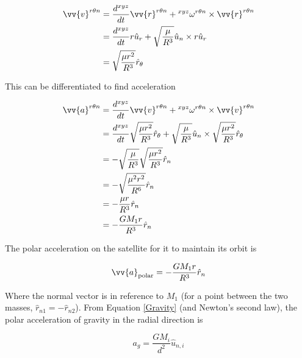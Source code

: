\documentclass[../basicOrbitalDynamics.tex]{subfiles}
\begin{document}
\begin{align*}
    \vv{v}^{r\theta{}n} & =\frac{d^{xyz}}{dt}{\vv{r}^{r\theta{}n}}+\prescript{xyz}{}{\omega}^{r\theta{}n}\times{}\vv{r}^{r\theta{}n} \\
    & =\frac{d^{xyz}}{dt}{r\hat{u}_r}+\sqrt{\frac{\mu}{R^3}}\hat{u}_n\times r\hat{u}_r\\
    & =\sqrt{\frac{\mu r^2}{R^3}}\hat{r}_\theta \\
\end{align*}

This can be differentiated to find acceleration

\begin{align*}
    \vv{a}^{r\theta{}n} & =\frac{d^{xyz}}{dt}{\vv{v}^{r\theta{}n}}+\prescript{xyz}{}{\omega}^{r\theta{}n}\times{}\vv{v}^{r\theta{}n}   \\
    & =\frac{d^{xyz}}{dt}\sqrt{\frac{\mu r^2}{R^3}}\hat{r}_\theta+\sqrt{\frac{\mu}{R^3}}\hat{u}_n\times \sqrt{\frac{\mu r^2}{R^3}}\hat{r}_\theta \\
    & =-\sqrt{\frac{\mu}{R^3}}\sqrt{\frac{\mu r^2}{R^3}}\hat{r}_n\\
    & =-\sqrt{\frac{\mu^2 r^2}{R^6}}\hat{r}_n\\
    & =-\frac{\mu r}{R^3}\hat{r}_n \\
    & =-\frac{GM_1r}{R^3}\hat{r}_n \\
\end{align*}

The polar acceleration on the satellite for it to maintain its orbit is

\[\st{\vv{a}}{polar}=-\frac{GM_1r}{R^3}\hat{r}_n\]

Where the normal vector is in reference to $M_1$ (for a point between the two masses, $\hat{r}_{n1}=-\hat{r}_{n2}$). From Equation \eqref{Gravity} (and Newton's second law), the polar acceleration of gravity in the radial direction is

\[a_g=\frac{GM_i}{d^2}\hat{u}_{n,i}\]
\end{document}
